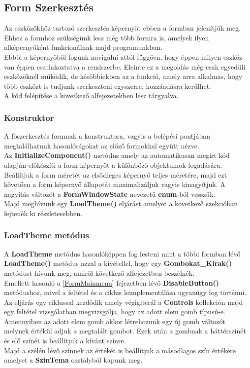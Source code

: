 \documentclass[tocnopagenum]{thesis-ekf}
\theoremstyle{definition}
\theoremstyle{remark}
\begin{document}
	\subsection{Form Szerkesztés}
	\label{Form Szerkesztes}
	Az eszközökhöz tartozó szerkesztés képernyőt ebben a formban jelenítjük meg. Ehhez a formhoz szükségünk lesz még több formra is, amelyek ilyen alképernyőként funkcionálnak majd programunkban.
	\\
	Ebből a képernyőből fogunk navigálni attól függően, hogy éppen milyen eszköz van éppen csatlakoztatva a rendszerbe. Eleinte ez a megoldás még csak egyedüli eszközöknél működik, de későbbiekben az a funkció, amely arra alkalmas, hogy több eszközt is tudjunk szerkeszteni egyszerre, hozzáadásra kerülhet.
	\\
	A kód felépítése a következő alfejezetekben lesz tárgyalva.
	\subsubsection{Konstruktor}
	A főszerkesztés formnak a konstruktora, vagyis a belépési pontjában megtalálhatunk hasonlóságokat az előző formokkal együtt nézve.
	\\
	Az \textbf{InitializeComponent()} metódus amely az automatikusan megírt kód alapján előkészíti a form képernyőt a különböző objektumok fogadására. Beállítjuk a form méretét az elsődleges képernyő teljes méretére, majd ezt követően a form képernyő állapotát maximalizáljuk vagyis kinagyítjuk. A nagyítás változót a \textbf{FormWindowState} nevezetű \textbf{enum}-ból vesszük.
	\\
	Majd meghívunk egy \textbf{LoadTheme()} eljárást amelyet a következő szekcióban fejtenék ki részletesebben. 
	\subsubsection{LoadTheme metódus}
	A \textbf{LoadTheme} metódus hasonlóképpen fog festeni mint a többi formban lévő \textbf{LoadTheme()} metódus azzal a kivétellel, hogy egy \textbf{Gombokat\_Kirak()} metódust hívunk meg, amiről következő alfejezetben beszélnék.
	\\
	Emellett hasonló a \ref{FormMainmenu} fejezetben lévő \textbf{DisableButton()} metódushoz, mivel a feltétel és a ciklus leimplementálása ugyanúgy fog történni. 
	\\
	Az eljárás egy ciklussal kezdődik amely végigiterál a \textbf{Controls} kollekción majd egy feltétel vizsgálatban megvizsgálja, hogy az adott elem gomb típusú-e. Amennyiben az adott elem gomb akkor létrehozunk egy új gomb változót melynek értékül adjuk a megtalált gombot. Ezek után a gombnak a háttérszínét és elő színét is beállítjuk a kívánt színre. 
	\\
	Majd a szélén lévő színnek az értékét is beállítjuk a másodlagos szín értékére amelyet a \textbf{SzinTema} osztályból kapunk meg.
\end{document}
